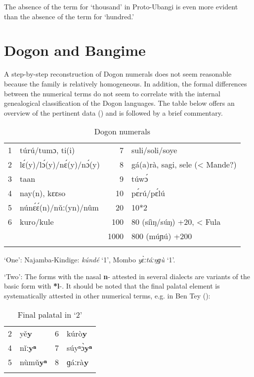 The absence of the term for ‘thousand’ in Proto-Ubangi is even more evident than the absence of the term for ‘hundred.’

\section{Dogon and Bangime}%

A step-by-step reconstruction of Dogon numerals does not seem reasonable because the family is relatively homogeneous. In addition, the formal differences between the numerical terms do not seem to correlate with the internal genealogical classification of the Dogon languages. The table below offers an overview of the pertinent data () and is followed by a brief commentary. 

\begin{table}
\caption{\label{tab:3:148}Dogon numerals}


\begin{tabularx}{\textwidth}{lXrQ}
\lsptoprule

{1} & t{\'{u}}r{\'{u}}/tumɔ, ti(i) & {7} & suli/soli/soye\\
{2} & l{\'{ɛ}}(y)/l{\'{ɔ}}(y)/n{\'{ɛ}}(y)/n{\'{ɔ}}(y) & {8} & gá(a)rà, sagi, sele (< Mande?)\\
{3} & taan & {9} & t{\'{u}}w{\'{ɔ}}\\
{4} & nay(n), kɛɛso & {10} & p{\'{ɛ}}r{\'{u}}/p{\'{ɛ}}l{\'{u}}\\
{5} & n{\'{u}}n{\'{ɛ}}{\'{ɛ}}(n)/n{\v{u}}ː(yn)/n{\^{u}}m & {20} & 10*2\\
{6} & kuro/kule & {100} & 80 (síìŋ/s{\'{u}}ŋ) +20, < Fula\\
&  & {1000} & 800 (m{\'{u}}ɲ{\'{u}}) +200\\
\lspbottomrule
\end{tabularx}
\end{table}

‘One’: Najamba-Kindige: \textit{k{\'{u}}ndé} ‘1’, Mombo \textit{y{\`{ɛ}}ːtáːŋɡ{\`{u}}} ‘1’.

‘Two’: The forms with the nasal \textbf{n}- attested in several dialects are variants of the basic form with \textbf{*l}-. It should be noted that the final palatal element is systematically attested in other numerical terms, e.g. in Ben Tey ():

\begin{table}
\caption{\label{tab:3:149}Final palatal in `2'}


\begin{tabularx}{\textwidth}{lXlQ}
\lsptoprule

2 & y{\v{e}}\textbf{y} & 6 & k{\'{u}}rò\textbf{y}\\
4 & n{\v{i}}ː\textbf{yⁿ} & 7 & s{\'{u}}yⁿ{\`{ɔ}}\textbf{yⁿ}\\
5 & n{\`{u}}m{\v{u}}\textbf{yⁿ} & 8 & ɡáːrà\textbf{y}\\
\lspbottomrule
\end{tabularx}
\end{table}

